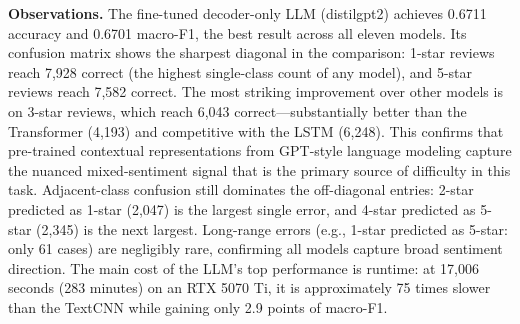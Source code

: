 \documentclass[12pt]{article}
\begin{document}
\textbf{Observations.} The fine-tuned decoder-only LLM (distilgpt2) achieves 0.6711 accuracy and 0.6701 macro-F1, the best result across all eleven models. Its confusion matrix shows the sharpest diagonal in the comparison: 1-star reviews reach 7,928 correct (the highest single-class count of any model), and 5-star reviews reach 7,582 correct. The most striking improvement over other models is on 3-star reviews, which reach 6,043 correct---substantially better than the Transformer (4,193) and competitive with the LSTM (6,248). This confirms that pre-trained contextual representations from GPT-style language modeling capture the nuanced mixed-sentiment signal that is the primary source of difficulty in this task. Adjacent-class confusion still dominates the off-diagonal entries: 2-star predicted as 1-star (2,047) is the largest single error, and 4-star predicted as 5-star (2,345) is the next largest. Long-range errors (e.g., 1-star predicted as 5-star: only 61 cases) are negligibly rare, confirming all models capture broad sentiment direction. The main cost of the LLM's top performance is runtime: at 17,006 seconds (283 minutes) on an RTX 5070 Ti, it is approximately 75 times slower than the TextCNN while gaining only 2.9 points of macro-F1.
\end{document}
